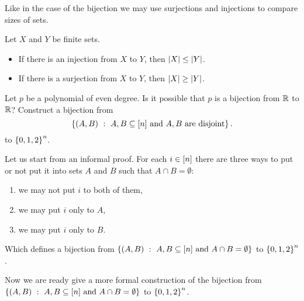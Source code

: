 Like in the case of the bijection we may use surjections and injections to
compare sizes of sets.
\begin{theorem}
\label{theorem:injections-surjections-inequalities}
    Let $X$ and $Y$ be finite sets.
    \begin{itemize}
        \item If there is an injection from $X$ to $Y$, then $\left|{X}\right|
          \le \left|{Y}\right|$.
        \item If there is a surjection from $X$ to $Y$, then $\left|{X}\right|
          \ge \left|{Y}\right|$.
    \end{itemize}
\end{theorem}

\begin{chapterendexercises}
  \exercise Let $p$ be a polynomial of even degree. Is it possible that $p$ is a
    bijection from ${\mathbb{R}}$ to ${\mathbb{R}}$?
  \exercise[recommended] Construct a bijection from
    \[
      \set[{A, B \subseteq \range{n} \text{ and } A, B \text{ are disjoint}}]{(A, B)}.
    \]
    to $\set{0, 1, 2}^n$.
    \begin{solution}
      Let us start from an informal proof. For each $i \in {[{n}]}$ there are
      three ways to put or not put it into sets $A$ and $B$ such that $A \cap B
      = \emptyset$:
      \begin{enumerate}
        \item we may not put $i$ to both of them,
        \item we may put $i$ only to $A$,
        \item we may put $i$ only to $B$.
      \end{enumerate}
      Which defines a bijection from 
      $\set[{A, B \subseteq [n] \text{ and } A \cap B = \emptyset}]{(A, B)}$ to
      $\set{0, 1, 2}^n$.

      Now we are ready give a more formal construction of the bijection from
      $\set[{A, B \subseteq [n] \text{ and } A \cap B = \emptyset}]{(A, B)}$ to
      $\set{0, 1, 2}^n$.


\end{solution}
\end{chapterendexercises}
